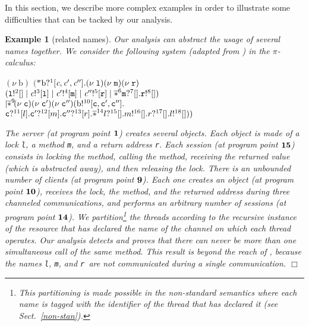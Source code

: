 \documentclass{article}
\newcommand{\boxexample}{$\Box$}
\newtheorem{example}[thm]{Example}
\newcommand{\picalcul}{$\pi$-calculus}
\newcommand{\concu}{|}
\newcommand{\nuu}{\nu\;}
\newcommand{\repli}{\ast}
\newcommand{\rec}{?}
\newcommand{\eme}{!}
\newcommand{\pp}[1]{$\bf{#1}$}
\newcommand{\pps}[1]{(at program point \pp{#1})}
\newcommand{\bang}[1]{\overline{\repli}^{#1}}
\newcommand{\globalname}[1]{\mathrm{#1}}
\newcommand{\internal}[1]{\textnormal{\texttt{#1}}}
\newcommand{\variable}[1]{\textit{#1}}
\newcommand{\alloc}{\globalname{b}}
\newcommand{\addone}{\variable{c}}
\newcommand{\addtwo}{\variable{c}'}
\newcommand{\addthree}{\variable{c}''}
\newcommand{\argone}{\internal{c}}
\newcommand{\argtwo}{\internal{c}'}
\newcommand{\argthree}{\internal{c}''}
\newcommand{\clock}{\internal{l}}
\newcommand{\cm}{\internal{m}}
\newcommand{\crr}{\internal{r}}
\newcommand{\twolaba}{1}
\newcommand{\twolabb}{2}
\newcommand{\twolabc}{3}
\newcommand{\twolabd}{4}
\newcommand{\twolabe}{5}
\newcommand{\twolabf}{6}
\newcommand{\twolabg}{7}
\newcommand{\twolabh}{8}
\newcommand{\twolabi}{9}
\newcommand{\twolabj}{10}
\newcommand{\twolabk}{11}
\newcommand{\twolabl}{12}
\newcommand{\twolabm}{13}
\newcommand{\twolabn}{14}
\newcommand{\twolabo}{15}
\newcommand{\twolabp}{16}
\newcommand{\twolabq}{17}
\newcommand{\twolabr}{18}
\begin{document}
In this section, 
we describe more complex examples in order to illustrate some difficulties that can be tacked by our analysis.

{
\begin{example}[related names]
Our analysis can  abstract the usage of several names together. We consider the following system (adapted from \cite{igarashi.kobayashi:generic-type}) in the \picalcul:
\label{twonames}
\begin{tabbing}
$(\nuu\alloc)$
$($$\repli$\=$\alloc\rec^{\twolaba}[\addone,\addtwo,\addthree].
(\nuu \clock)(\nuu \cm)(\nuu \crr)$\\
\hspace*{1cm}$(\clock\eme^{\twolabb}[]\;\concu\;\addone\eme^{\twolabc}[\clock]\;\concu\; \addtwo\eme^{\twolabd}[\cm]\;\concu\; \addthree\eme^{\twolabe}[\crr]\;\concu\;\bang{\twolabf}\cm\rec^{\twolabg}[].\crr\eme^{\twolabh}[])$\\
$\concu \bang{\twolabi}\!(\nuu \argone)(\nuu \argtwo)(\nuu \argthree)(\alloc\eme^{\twolabj}[\argone,\argtwo,\argthree].$\\
\hspace*{1cm}$\argone\rec^{\twolabk}[l].\argtwo\rec^{\twolabl}[m].\argthree\rec^{\twolabm}[r].\bang{\twolabn}l\rec^{\twolabo}[].m\eme^{\twolabp}[].r\rec^{\twolabq}[].l\eme^{\twolabr}[]))$
\end{tabbing}
The server \pps{\twolaba} creates several objects. Each object is made of a lock \clock, a method \cm, and a return address \crr. 
Each session \pps{\twolabo} consists in locking the method, calling the method, receiving the returned value (which is abstracted away),  
and then releasing the lock. 
There is an unbounded number of clients \pps{\twolabi}. 
Each one creates an object \pps{\twolabj}, 
receives the lock, the method, and the returned address during three channeled communications, and performs an arbitrary number of sessions \pps{\twolabn}. 
We partition\footnote{This partitioning is made possible in the non-standard semantics where each name is tagged with the identifier of the thread that has declared it (see Sect.~{\ref{non-stan}}).}
 the threads according to the recursive instance of the resource that has declared the name of the channel on which each thread operates.
Our analysis detects and proves that there can never be more than one simultaneous call of the same method.  This result is beyond the reach of \cite{igarashi.kobayashi:generic-type}, because the names \clock, \cm, and \crr\  are not communicated during a single communication.
\boxexample
\end{example}}
\end{document}
